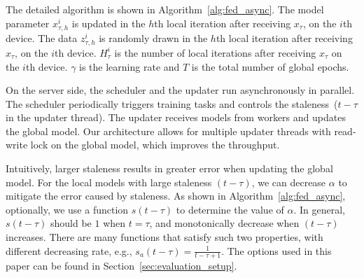 \documentclass{opt2020} %
\begin{document}
The detailed algorithm is shown in Algorithm~\ref{alg:fed_async}. The model parameter $x_{\tau, h}^i$ is updated in the $h$th local iteration after receiving $x_\tau$, on the $i$th device. The data $z_{\tau, h}^i$ is randomly drawn in the $h$th local iteration after receiving $x_\tau$, on the $i$th device. $H_{\tau}^i$ is the number of local iterations after receiving $x_\tau$ on the $i$th device. $\gamma$ is the learning rate and $T$ is the total number of global epochs.

\begin{remark}
On the server side, the scheduler and the updater run asynchronously in parallel. The scheduler periodically triggers training tasks and controls the staleness~($t-\tau$ in the updater thread). The updater receives models from workers and updates the global model. Our architecture allows for multiple updater threads with read-write lock on the global model, which improves the throughput.
\end{remark}



\begin{remark}
Intuitively, larger staleness results in greater error when updating the global model. For the local models with large staleness $(t-\tau)$, we can decrease $\alpha$ to mitigate the error caused by staleness.
As shown in Algorithm~\ref{alg:fed_async}, optionally, we use a function $s(t-\tau)$ to determine the value of $\alpha$. In general, $s(t-\tau)$ should be $1$ when $t = \tau$, and monotonically decrease when $(t-\tau)$ increases. There are many functions that satisfy such two properties, with different decreasing rate, e.g., $s_a(t-\tau) = \frac{1}{t-\tau+1}$.
The options used in this paper can be found in Section~\ref{sec:evaluation_setup}.
\end{remark}
\end{document}
